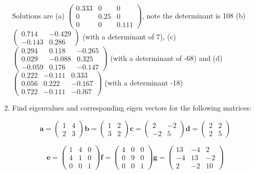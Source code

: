 \documentclass{article}
\begin{document}
\begin{enumerate}
Solutions are (a) $\left( \begin{array}{rrr} 0.333 & 0 & 0 \\ 0 & 0.25 & 0 \\ 0 & 0 & 0.111 \end{array} \right)$, note the determinant is 108 (b) $\left( \begin{array}{rr} 0.714 & -0.429 \\ -0.143 & 0.286  \end{array} \right)$ (with a determinant of 7), (c)  $\left( \begin{array}{rrr} 0.294 & 0.118 & -0.265 \\ 0.029 & -0.088 & 0.325 \\ -0.059 & 0.176 & -0.147 \end{array} \right)$ (with a determinant of -68) and (d) $ \left( \begin{array}{rrr} 0.222 & -0.111 & 0.333 \\ 0.056 & 0.222 & -0.167 \\ 0.722 & -0.111 & -0.l67 \end{array} \right)$ (with a determinant -18)


\item Find eigenvalues and corresponding eigen vectors for the following matrices:


\begin{displaymath}
\boldsymbol{a} = \left( \begin{array}{rr} 1 & 4\\ 2 & 3 \end{array} \right)
\boldsymbol{b} = \left( \begin{array}{rr} 1 & 2 \\ 3 & 2  \end{array} \right)
\boldsymbol{c} = \left( \begin{array}{rr} 2 & -2 \\ -2 & 5 \end{array} \right)
\boldsymbol{d} = \left( \begin{array}{rr} 2 & 2 \\ 2 & 5 \end{array} \right)
\end{displaymath}

\begin{displaymath}
\boldsymbol{e} = \left( \begin{array}{rrr} 1 & 4 & 0\\ 4 & 1 & 0 \\ 0 & 0 & 1 \end{array} \right)
\boldsymbol{f} = \left( \begin{array}{rrr} 4 & 0 & 0 \\ 0  & 9 & 0 \\ 0 & 0 & 1  \end{array} \right)
\boldsymbol{g} = \left( \begin{array}{rrr} 13 & -4 & 2\\ -4 & 13 & -2 \\ 2 & -2 & 10 \end{array} \right)
\end{displaymath}



\end{enumerate}
\end{document}
